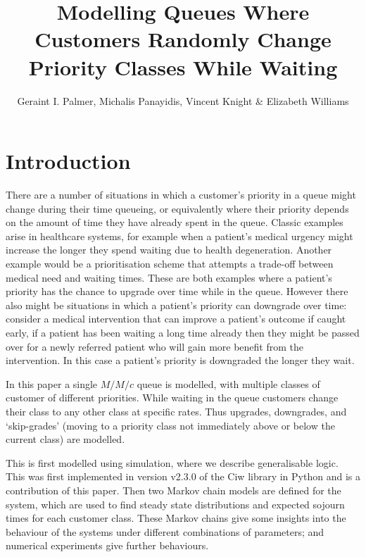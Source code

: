\documentclass{article}
\title{Modelling Queues Where Customers Randomly Change Priority Classes While Waiting}
\author{Geraint I. Palmer, Michalis Panayidis, Vincent Knight \& Elizabeth Williams}
\date{}
\begin{document}
\maketitle

\section{Introduction}
There are a number of situations in which a customer's priority in a queue might
change during their time queueing, or equivalently where their priority depends
on the amount of time they have already spent in the queue.
Classic examples arise in healthcare systems, for example when a patient's
medical urgency might increase the longer they spend waiting due to health
degeneration. Another example would be a prioritisation scheme that attempts a
trade-off between medical need and waiting times.
These are both examples where a patient's priority has the chance to upgrade
over time while in the queue.
However there also might be situations in which a patient's priority can
downgrade over time: consider a medical intervention that can improve a
patient's outcome if caught early, if a patient has been waiting a long time
already then they might be passed over for a newly referred patient who will
gain more benefit from the intervention. In this case a patient's priority is
downgraded the longer they wait.

In this paper a single $M/M/c$ queue is modelled, with multiple classes of
customer of different priorities. While waiting in the queue customers change
their class to any other class at specific rates. Thus upgrades, downgrades, and
`skip-grades' (moving to a priority class not immediately above or below the
current class) are modelled.

This is first modelled using simulation, where we describe generalisable logic.
This was first implemented in version v2.3.0 of the Ciw library in Python
\cite{palmer19} and is a contribution of this paper.
Then two Markov chain models are defined for the system, which are used to find
steady state distributions and expected sojourn times for each customer class.
These Markov chains give some insights into the behaviour of the systems under
different combinations of parameters; and numerical experiments give further
behaviours.
\end{document}
